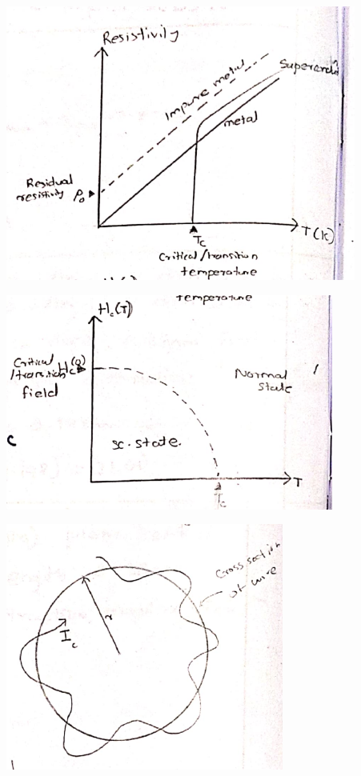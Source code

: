 \documentclass[12pt, a4paper]{article}
\begin{document}
\begin{minipage}[t][][b]{.3\textwidth}%
	\includegraphics[max width=\textwidth]{rs}

	\includegraphics[max width=\textwidth]{ht}

	\includegraphics[max width=\textwidth]{wire}
\end{minipage}
\end{document}
